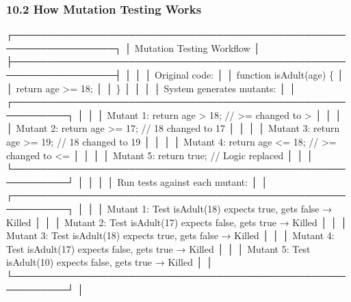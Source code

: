 \documentclass[
]{article}
\newenvironment{Shaded}{}{}
\newcommand{\NormalTok}[1]{#1}
\begin{document}
\hypertarget{102-how-mutation-testing-works}{%
\subsubsection{10.2 How Mutation Testing
Works}\label{102-how-mutation-testing-works}}

\begin{Shaded}
\begin{Highlighting}[]
\NormalTok{┌─────────────────────────────────────────────────────────────────┐}
\NormalTok{│                  Mutation Testing Workflow                       │}
\NormalTok{├─────────────────────────────────────────────────────────────────┤}
\NormalTok{│                                                                  │}
\NormalTok{│  Original code:                                                 │}
\NormalTok{│  function isAdult(age) \{                                         │}
\NormalTok{│    return age \textgreater{}= 18;                                             │}
\NormalTok{│  \}                                                               │}
\NormalTok{│                                                                  │}
\NormalTok{│  System generates mutants:                                       │}
\NormalTok{│  ┌──────────────────────────────────────────────────────────┐   │}
\NormalTok{│  │ Mutant 1: return age \textgreater{} 18;    // \textgreater{}= changed to \textgreater{}         │   │}
\NormalTok{│  │ Mutant 2: return age \textgreater{}= 17;   // 18 changed to 17        │   │}
\NormalTok{│  │ Mutant 3: return age \textgreater{}= 19;   // 18 changed to 19        │   │}
\NormalTok{│  │ Mutant 4: return age \textless{}= 18;   // \textgreater{}= changed to \textless{}=        │   │}
\NormalTok{│  │ Mutant 5: return true;        // Logic replaced          │   │}
\NormalTok{│  └──────────────────────────────────────────────────────────┘   │}
\NormalTok{│                                                                  │}
\NormalTok{│  Run tests against each mutant:                                 │}
\NormalTok{│  ┌──────────────────────────────────────────────────────────┐   │}
\NormalTok{│  │ Mutant 1: Test isAdult(18) expects true, gets false → Killed │}
\NormalTok{│  │ Mutant 2: Test isAdult(17) expects false, gets true → Killed │}
\NormalTok{│  │ Mutant 3: Test isAdult(18) expects true, gets false → Killed │}
\NormalTok{│  │ Mutant 4: Test isAdult(17) expects false, gets true → Killed │}
\NormalTok{│  │ Mutant 5: Test isAdult(10) expects false, gets true → Killed │}
\NormalTok{│  └──────────────────────────────────────────────────────────┘   │}

\end{Highlighting}
\end{Shaded}
\end{document}
